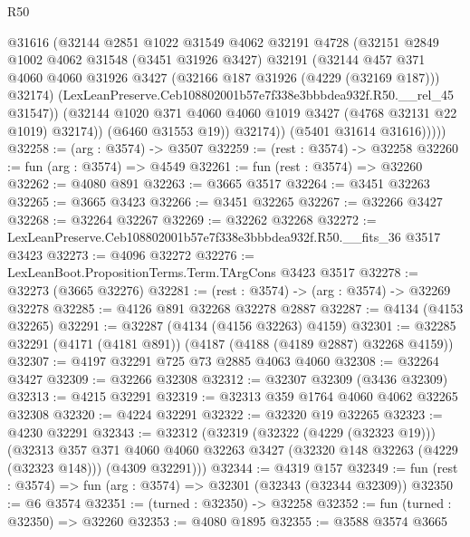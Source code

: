 \begin{lexlean}{R50}
\begin{coremodule}
                  @31616
                  (@32144
                    @2851
                    @1022
                    @31549
                    @4062
                    @32191
                    @4728
                    (@32151
                      @2849
                      @1002
                      @4062
                      @31548
                      (@3451 @31926 @3427)
                      @32191
                      (@32144
                        @457
                        @371
                        @4060
                        @4060
                        @31926
                        @3427
                        (@32166 @187 @31926 (@4229 (@32169 @187)))
                        @32174)
                      (LexLeanPreserve.Ceb108802001b57e7f338e3bbbdea932f.R50.__rel_45 @31547))
                    (@32144 @1020 @371 @4060 @4060 @1019 @3427 (@4768 @32131 @22 @1019) @32174))
                  (@6460 @31553 @19))
                @32174))
            (@5401 @31614 @31616)))))
@32258 := (arg : @3574) -> @3507
@32259 := (rest : @3574) -> @32258
@32260 := fun (arg : @3574) => @4549
@32261 := fun (rest : @3574) => @32260
@32262 := @4080 @891
@32263 := @3665 @3517
@32264 := @3451 @32263
@32265 := @3665 @3423
@32266 := @3451 @32265
@32267 := @32266 @3427
@32268 := @32264 @32267
@32269 := @32262 @32268
@32272 := LexLeanPreserve.Ceb108802001b57e7f338e3bbbdea932f.R50.__fits_36 @3517 @3423
@32273 := @4096 @32272
@32276 := LexLeanBoot.PropositionTerms.Term.TArgCons @3423 @3517
@32278 := @32273 (@3665 @32276)
@32281 := (rest : @3574) -> (arg : @3574) -> @32269 @32278
@32285 := @4126 @891 @32268 @32278 @2887
@32287 := @4134 (@4153 @32265)
@32291 := @32287 (@4134 (@4156 @32263) @4159)
@32301 := @32285 @32291 (@4171 (@4181 @891)) (@4187 (@4188 (@4189 @2887) @32268 @4159))
@32307 := @4197 @32291 @725 @73 @2885 @4063 @4060
@32308 := @32264 @3427
@32309 := @32266 @32308
@32312 := @32307 @32309 (@3436 @32309)
@32313 := @4215 @32291
@32319 := @32313 @359 @1764 @4060 @4062 @32265 @32308
@32320 := @4224 @32291
@32322 := @32320 @19 @32265
@32323 := @4230 @32291
@32343 := @32312
    (@32319
      (@32322 (@4229 (@32323 @19)))
      (@32313
        @357
        @371
        @4060
        @4060
        @32263
        @3427
        (@32320 @148 @32263 (@4229 (@32323 @148)))
        (@4309 @32291)))
@32344 := @4319 @157
@32349 := fun (rest : @3574) => fun (arg : @3574) => @32301 (@32343 (@32344 @32309))
@32350 := @6 @3574
@32351 := (turned : @32350) -> @32258
@32352 := fun (turned : @32350) => @32260
@32353 := @4080 @1895
@32355 := @3588 @3574 @3665

\end{coremodule}
\end{lexlean}
